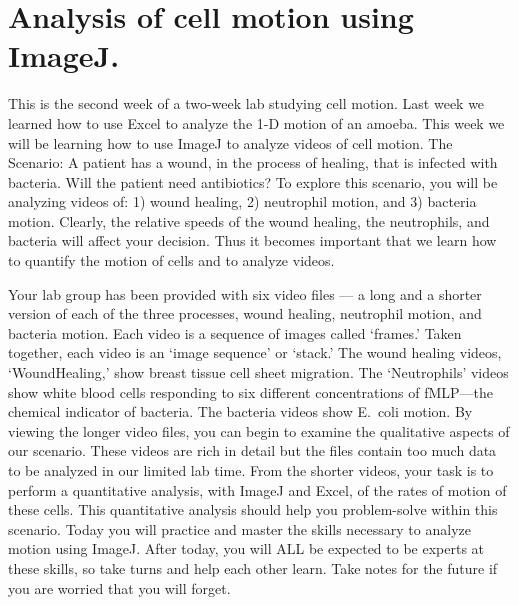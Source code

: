 \section{Analysis of cell motion using ImageJ.}
This is the second week of a two-week lab studying cell motion.
Last week we learned how to use Excel to analyze the 1-D motion of an amoeba.
This week we will be learning how to use ImageJ to analyze videos of cell motion.
The Scenario: A patient has a wound, in the process of healing, that is infected with bacteria.
Will the patient need antibiotics?
To explore this scenario, you will be analyzing videos of: 1) wound healing, 2) neutrophil motion, and 3) bacteria motion.
Clearly, the relative speeds of the wound healing, the neutrophils, and bacteria will affect your decision.
Thus it becomes important that we learn how to quantify the motion of cells and to analyze videos. 
\par
Your lab group has been provided with six video files — a long and a shorter version of
each of the three processes, wound healing, neutrophil motion, and bacteria motion.
Each video is a sequence of images called ‘frames.'
Taken together, each video is an ‘image sequence' or ‘stack.'
The wound healing videos, ‘WoundHealing,' show breast tissue cell sheet migration.
The ‘Neutrophils' videos show white blood cells responding to six different concentrations of fMLP—the chemical indicator of bacteria.
The bacteria videos show E.\ coli motion.
By viewing the longer video files, you can begin to examine the qualitative aspects of our scenario.
These videos are rich in detail but the files contain too much data to be analyzed in our limited lab time.
From the shorter videos, your task is to perform a quantitative analysis, with ImageJ and Excel, of the rates of motion of these cells.
This quantitative analysis should help you problem-solve within this scenario.
Today you will practice and master the skills necessary to analyze motion using ImageJ.
After today, you will ALL be expected to be experts at these skills, so take turns and help each other learn.
Take notes for the future if you are worried that you will forget.

